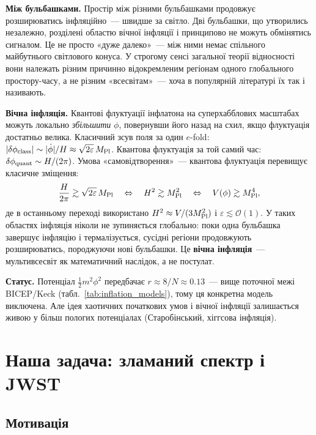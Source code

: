 \documentclass[12pt, a4paper]{article}
\begin{document}
\textbf{Між бульбашками.} Простір між різними бульбашками
продовжує розширюватись інфляційно~--- швидше за світло.
Дві бульбашки, що утворились незалежно, розділені областю
вічної інфляції і принципово не можуть обмінятись сигналом.
Це не просто «дуже далеко»~--- між ними немає спільного
майбутнього світлового конуса. У строгому сенсі загальної теорії відносності вони
належать різним причинно відокремленим регіонам
одного глобального простору-часу, а не різним «всесвітам»~---
хоча в популярній літературі їх так і називають.

\textbf{Вічна інфляція.} Квантові флуктуації інфлатона на
суперхабблових масштабах можуть локально \emph{збільшити} $\phi$,
повернувши його назад на схил, якщо флуктуація достатньо велика.
Класичний зсув поля за один $e$-fold: $|\delta\phi_{\rm class}|
\sim |\dot\phi|/H \approx \sqrt{2\varepsilon}\,M_{\rm Pl}$.
Квантова флуктуація за той самий час: $\delta\phi_{\rm quant}
\sim H/(2\pi)$. Умова «самовідтворення»~---
квантова флуктуація перевищує класичне зміщення:
\begin{equation*}
  \frac{H}{2\pi} \gtrsim \sqrt{2\varepsilon}\,M_{\rm Pl}
  \quad\Leftrightarrow\quad
  H^2 \gtrsim M_{\rm Pl}^2
  \quad\Leftrightarrow\quad
  V(\phi) \gtrsim M_{\rm Pl}^4,
\end{equation*}
де в останньому переході використано $H^2 \approx V/(3M_{\rm Pl}^2)$
і $\varepsilon \lesssim \mathcal{O}(1)$.
У таких областях інфляція ніколи не зупиняється глобально:
поки одна бульбашка завершує інфляцію і термалізується,
сусідні регіони продовжують розширюватись, породжуючи нові
бульбашки. Це \textbf{вічна інфляція}~--- мультивсесвіт
як математичний наслідок, а не постулат.

\textbf{Статус.} Потенціал $\tfrac{1}{2}m^2\phi^2$ передбачає
$r \approx 8/N \approx 0.13$~--- вище поточної межі BICEP/Keck
(табл.~\ref{tab:inflation_models}), тому ця конкретна модель
виключена. Але ідея хаотичних початкових умов і вічної інфляції
залишається живою у більш пологих потенціалах (Старобінський,
хіггсова інфляція).


\section{Наша задача: зламаний спектр і JWST}
\label{sec:broken}

\subsection{Мотивація}
\end{document}
